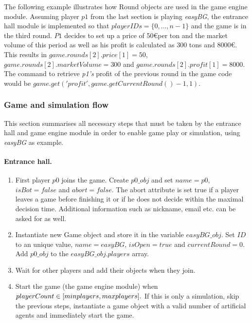The following example illustrates how Round objects are used in the game engine module. Assuming player $p1$ from the last section is playing \textit{easyBG}, the entrance hall module is implemented so that $playerIDs = \{0,\dots, n-1\}$ and the game is in the third round. $P1$ decides to set up a price of 50\euro \space per ton and the market volume of this period as well as his profit is calculated as 300 tons and 8000\euro. This results in $game.rounds[2].price[1]=50$, $game.rounds[2].marketVolume=300$ and $game.rounds[2].profit[1]=8000$. The command to retrieve \textit{p1's} profit of the previous round in the game code would be \newline $game.get('profit', game.getCurrentRound()-1, 1)$.

\subsubsection{Game and simulation flow}
\label{subsub:flow}

This section summarises all necessary steps that must be taken by the entrance hall and game engine module in order to enable game play or simulation, using \textit{easyBG} as example. \newpage

\paragraph{Entrance hall.} \begin{enumerate}
\item First player $p0$ joins the game. Create $p0\_obj$ and set $name=p0$, $isBot=false$ and $abort=false$. The abort attribute is set true if a player leaves a game before finishing it or if he does not decide within the maximal decision time. Additional information such as nickname, email etc. can be asked for as well.
\item Instantiate new Game object and store it in the variable $easyBG\_obj$. Set $ID$ to an unique value, $name=easyBG$, $isOpen=true$ and $currentRound=0$. Add $p0\_obj$ to the $easyBG\_obj.players$ array.
\item Wait for other players and add their objects when they join.
\item Start the game (the game engine module) when $playerCount \in [minplayers, \newline maxplayers].$ If this is only a simulation, skip the previous steps, instantiate a game object with a valid number of artificial agents and immediately start the game.
\end{enumerate}

